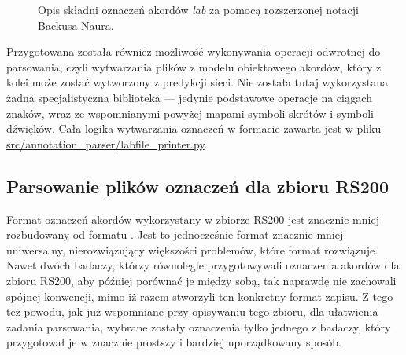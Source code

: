\begin{figure}
    \centering
    {\scriptsize }
    \caption{Opis składni oznaczeń akordów \emph{lab} za pomocą rozszerzonej notacji Backusa-Naura.}
    \label{fig:lab_syntax}
\end{figure}

Przygotowana została również możliwość wykonywania operacji odwrotnej do parsowania, czyli wytwarzania plików  z modelu obiektowego akordów, który z kolei może zostać wytworzony z predykcji sieci. Nie została tutaj wykorzystana żadna specjalistyczna biblioteka --- jedynie podstawowe operacje na ciągach znaków, wraz ze wspomnianymi powyżej mapami symboli skrótów i symboli dźwięków. Cała logika wytwarzania oznaczeń w formacie  zawarta jest w pliku \url{src/annotation_parser/labfile_printer.py}.

\subsection{Parsowanie plików oznaczeń dla zbioru RS200}

Format oznaczeń akordów wykorzystany w zbiorze RS200 jest znacznie mniej rozbudowany od formatu . Jest to jednocześnie format znacznie mniej uniwersalny, nierozwiązujący większości problemów, które format  rozwiązuje. Nawet dwóch badaczy, którzy równolegle przygotowywali oznaczenia akordów dla zbioru RS200, aby później porównać je między sobą, tak naprawdę nie zachowali spójnej konwencji, mimo iż razem stworzyli ten konkretny format zapisu. Z tego też powodu, jak już wspomniane przy opisywaniu tego zbioru, dla ułatwienia zadania parsowania, wybrane zostały oznaczenia tylko jednego z badaczy, który przygotował je w znacznie prostszy i bardziej uporządkowany sposób.

